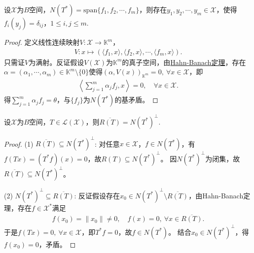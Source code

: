 \documentclass[../../main.tex]{subfiles}%
\begin{document}
\begin{lemma}
设$\mathscr{X}$为$B$空间，$N(T^*)=\mathrm{span}\{f_1,f_2,\cdots,f_m\}$，则存在$y_1,y_2,\cdots,y_m\in\mathscr{X}$，使得$f_i(y_j)=\delta_{ij}$，$1\leqslant i,j\leqslant m$.
\end{lemma}
\begin{proof}

定义线性连续映射$V:\mathscr{X}\to\mathbb{K}^m$，
\begin{align*}
V:x\mapsto(\langle f_1,x\rangle,\langle f_2,x\rangle,\cdots,\langle f_m,x\rangle).
\end{align*}
只需证$V$为满射。反证假设$V(\mathscr{X})$为$\mathbb{K}^m$的真子空间，由\hyperref[theorem:泛函分析--(哈恩-巴拿赫)Hahn-Banach定理]{Hahn-Banach定理}，存在$\alpha=(\alpha_1,\cdots,\alpha_m)\in\mathbb{K}^m\setminus\{0\}$使得$(\alpha,V(x))_{\mathbb{K}^m}=0,\ \forall x\in\mathscr{X}$，即
\begin{align*}
\left\langle\sum\limits_{j=1}^m\alpha_jf_j,x\right\rangle=0,\quad \forall x\in\mathscr{X}.
\end{align*}
得$\sum\limits_{j=1}^m\alpha_jf_j=\theta$，与$\{f_j\}$为$N(T^*)$的基矛盾。

\end{proof}

\begin{lemma}
设$\mathscr{X}$为$B$空间，$T\in\mathscr{L}(\mathscr{X})$，则$\overline{R(T)}=N(T^*)^\perp$.
\end{lemma}

\begin{proof}

(1) $\overline{R(T)}\subseteq N(T^*)^\perp$:
对任意$x\in\mathscr{X}$，$f\in N(T^*)$，有$f(Tx)=(T^*f)(x)=0$，故$R(T)\subseteq N(T^*)^\perp$。
因$N(T^*)^\perp$为闭集，故$\overline{R(T)}\subseteq N(T^*)^\perp$。

(2) $N(T^*)^\perp\subseteq\overline{R(T)}$:
反证假设存在$x_0\in N(T^*)^\perp\setminus\overline{R(T)}$，由Hahn-Banach定理，存在$f\in\mathscr{X}^*$满足
\begin{align*}
f(x_0)=\|x_0\|\neq0,\quad f(x)=0,\ \forall x\in\overline{R(T)}.
\end{align*}
于是$f(Tx)=0,\ \forall x\in\mathscr{X}$，即$T^*f=0$，故$f\in N(T^*)$。
结合$x_0\in N(T^*)^\perp$，得$f(x_0)=0$，矛盾。

\end{proof}
\end{document}
